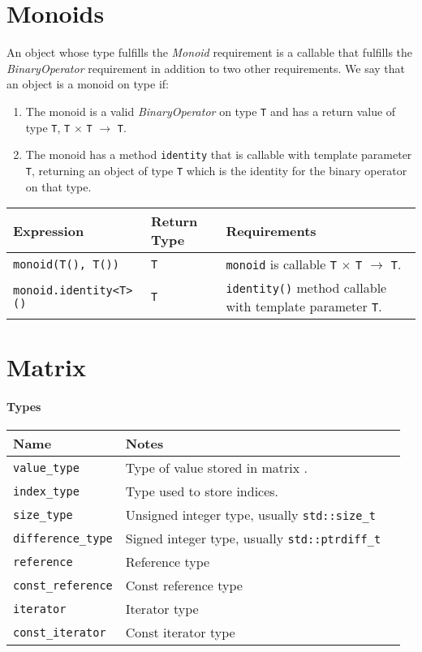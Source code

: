 \section{Monoids}
An object whose type fulfills the \textit{Monoid} requirement is a callable that
fulfills the \textit{BinaryOperator} requirement in addition to two other requirements.
We say that an object is a monoid on type  if:

\begin{enumerate}
   \item The monoid is a valid \textit{BinaryOperator} on type \texttt{T} and has a return value of type \texttt{T}, \texttt{T} $\times$ \texttt{T} $\rightarrow$ \texttt{T}.
   \item The monoid has a method \texttt{identity} that is callable with template parameter \texttt{T}, returning an object of type \texttt{T} which is the identity for the binary operator on that type.
\end{enumerate}

\begin{tabularx}{\textwidth}{l l X}
\textbf{Expression} & \textbf{Return Type} & \textbf{Requirements}\\
\hline
\texttt{monoid(T(), T())} & \texttt{T} & \texttt{monoid} is callable \texttt{T} $\times$ \texttt{T} $\rightarrow$ \texttt{T}.\\
\hline
\texttt{monoid.identity<T>()} & \texttt{T} & \texttt{identity()} method callable with template parameter \texttt{T}.\\
\end{tabularx}

\section{Matrix}

\paragraph{Types}

\begin{tabularx}{\textwidth}{l l X}
\textbf{Name} & \textbf{Notes}\\
\hline
\texttt{value\_type} & Type of value stored in matrix .\\ \hline
\texttt{index\_type} & Type used to store indices.\\ \hline
\texttt{size\_type}  & Unsigned integer type, usually \texttt{std::size\_t} \\ \hline
\texttt{difference\_type}  & Signed integer type, usually \texttt{std::ptrdiff\_t} \\ \hline
\texttt{reference} & Reference type\\ \hline
\texttt{const\_reference}  & Const reference type\\ \hline
\texttt{iterator}  & Iterator type\\ \hline
\texttt{const\_iterator}  & Const iterator type\\ \hline
\end{tabularx}

